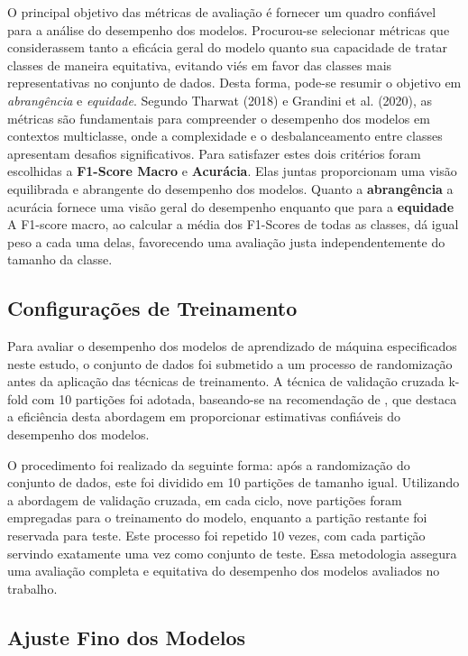 O principal objetivo das métricas de avaliação é fornecer um quadro confiável para a análise do desempenho dos modelos. Procurou-se selecionar métricas que considerassem tanto a eficácia geral do modelo quanto sua capacidade de tratar classes de maneira equitativa, evitando viés em favor das classes mais representativas no conjunto de dados.  Desta forma, pode-se resumir o objetivo em \textit{abrangência} e \textit{equidade}.  Segundo Tharwat (2018) e Grandini et al. (2020), as métricas são fundamentais para compreender o desempenho dos modelos em contextos multiclasse, onde a complexidade e o desbalanceamento entre classes apresentam desafios significativos.
Para satisfazer estes dois critérios foram escolhidas a \textbf{F1-Score Macro} e \textbf{Acurácia}. Elas juntas proporcionam uma visão equilibrada e abrangente do desempenho dos modelos.
Quanto a \textbf{abrangência} a acurácia fornece uma visão geral do desempenho enquanto que para a \textbf{equidade} A F1-score macro, ao calcular a média dos F1-Scores de todas as classes, dá igual peso a cada uma delas, favorecendo uma avaliação justa independentemente do tamanho da classe.

\subsection{Configurações de Treinamento}

Para avaliar o desempenho dos modelos de aprendizado de máquina especificados neste estudo, o conjunto de dados foi submetido a um processo de randomização antes da aplicação das técnicas de treinamento. A técnica de validação cruzada k-fold com 10 partições foi adotada, baseando-se na recomendação de \cite{kohavi1995study}, que destaca a eficiência desta abordagem em proporcionar estimativas confiáveis do desempenho dos modelos.

O procedimento foi realizado da seguinte forma: após a randomização do conjunto de dados, este foi dividido em 10 partições de tamanho igual. Utilizando a abordagem de validação cruzada, em cada ciclo, nove partições foram empregadas para o treinamento do modelo, enquanto a partição restante foi reservada para teste. Este processo foi repetido 10 vezes, com cada partição servindo exatamente uma vez como conjunto de teste. Essa metodologia assegura uma avaliação completa e equitativa do desempenho dos modelos avaliados no trabalho.

\subsection{Ajuste Fino dos Modelos}


